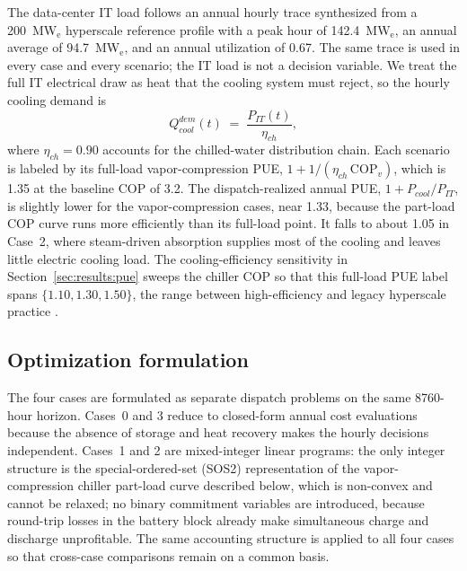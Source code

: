 \documentclass[a4paper,fleqn]{cas-sc}
\begin{document}
The data-center IT load follows an annual hourly trace synthesized from a 200~MW$_\mathrm{e}$ hyperscale reference profile with a peak hour of 142.4~MW$_\mathrm{e}$, an annual average of 94.7~MW$_\mathrm{e}$, and an annual utilization of 0.67. The same trace is used in every case and every scenario; the IT load is not a decision variable. We treat the full IT electrical draw as heat that the cooling system must reject, so the hourly cooling demand is
\begin{equation}
\label{eq:cool_demand}
Q_{cool}^{dem}(t) \;=\; \frac{P_{IT}(t)}{\eta_{ch}},
\end{equation}
where $\eta_{ch}=0.90$ accounts for the chilled-water distribution chain. Each scenario is labeled by its full-load vapor-compression PUE, $1+1/(\eta_{ch}\,\mathrm{COP}_v)$, which is 1.35 at the baseline COP of 3.2. The dispatch-realized annual PUE, $1+P_{cool}/P_{IT}$, is slightly lower for the vapor-compression cases, near 1.33, because the part-load COP curve runs more efficiently than its full-load point. It falls to about 1.05 in Case~2, where steam-driven absorption supplies most of the cooling and leaves little electric cooling load. The cooling-efficiency sensitivity in Section~\ref{sec:results:pue} sweeps the chiller COP so that this full-load PUE label spans $\{1.10, 1.30, 1.50\}$, the range between high-efficiency and legacy hyperscale practice \citep{greenGrid2012pue,ashrae2021thermal}.

\subsection{Optimization formulation}
\label{sec:methods:opt}

The four cases are formulated as separate dispatch problems on the same 8760-hour horizon. Cases~0 and 3 reduce to closed-form annual cost evaluations because the absence of storage and heat recovery makes the hourly decisions independent. Cases~1 and 2 are mixed-integer linear programs: the only integer structure is the special-ordered-set (SOS2) representation of the vapor-compression chiller part-load curve described below, which is non-convex and cannot be relaxed; no binary commitment variables are introduced, because round-trip losses in the battery block already make simultaneous charge and discharge unprofitable. The same accounting structure is applied to all four cases so that cross-case comparisons remain on a common basis.
\end{document}
